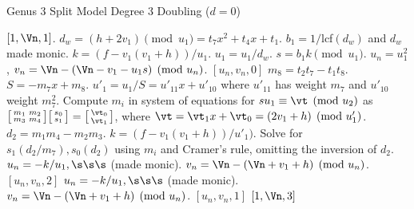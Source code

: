 \begin{subroutine}[htbp]
\caption{Genus 3 Split Model Degree 3 Doubling ($d = 0$) \label{sub:g3explSPLIT3DBLd}}
\begin{algorithmic} [1]
     \hspace{1pt} \Return $[1,\Vn,1]$.
    \Else \hspace{2pt} $d_w =  (h + 2v_1) \pmod{u_1} = t_7x^2 + t_4x + t_1.$
        \State $b_1 = 1/$lcf$(d_w)$ and $d_w$ made monic.
        \State $k = (f - v_1(v_1 + h))/u_1$.
        \State $u_1 = u_1/d_w$.
        \State $s = b_1k \pmod{u_1}$.
        \State $u_n = u_1^2$, $v_n = \Vn - (\Vn - v_1 - u_1s) \pmod{u_n}$.
        \State \Return $[u_n,v_n,0]$
    \EndIf
\Else \hspace{2pt} $m_8 = t_2t_7 - t_1t_8$. 
    \State $S = -m_7x + m_8$.
    \State $u'_1 = u_1/S = u'_{11}x + u'_{10}$ where $u'_{11}$ has weight $m_7$ and $u'_{10}$ weight $m_7^2$.        
    \State Compute $m_i$ in system of equations for $su_1\equiv \vt \pmod{u_2}$ as $ \bigl[ \begin{smallmatrix} m_1 & m_2\\ m_3 & m_4\end{smallmatrix}\bigr] \bigl[ \begin{smallmatrix} s_0\\ s_1 \end{smallmatrix} \bigr ] = \bigl[ \begin{smallmatrix}\vt_0 \\  \vt_1\end{smallmatrix} \bigr ]$,
    \Statex \hspace{18pt}  where $\vt = \vt_1x + \vt_0 = (2v_1 + h) \pmod{u'_1}$.
    \State $d_2 = m_1m_4 - m_2m_3$.  
    \State $k = (f - v_1(v_1 + h))/u'_1)$.
    \State Solve for $s_1(d_2/m_7), s_0(d_2)$ using $m_i$ and Cramer's rule, omitting the inversion of $d_2$.
             \hspace{2pt} $u_n = -k/u_1, \s\s\s$ (made monic).
                \State $v_n = \Vn - (\Vn + v_1 + h) \pmod{u_n}$.
                \State \Return $[u_n,v_n,2]$
            \Else \hspace{2pt} $u_n = -k/u_1, \s\s\s$ (made monic).
                \State $v_n = \Vn - (\Vn + v_1 + h) \pmod{u_n}$.
                \State \Return $[u_n,v_n,1]$
            \EndIf
        \Else
                 \Return $[1,\Vn,3]$

\end{algorithmic}
\end{subroutine}
